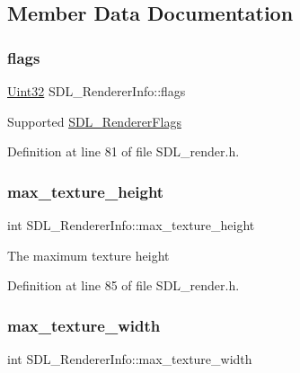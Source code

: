\subsection{Member Data Documentation}
\mbox{\label{struct_s_d_l___renderer_info_a95cf0ffd1704fd0a4dd8ceac6c9f0542}} 
\subsubsection{\texorpdfstring{flags}{flags}}
{\footnotesize\ttfamily \mbox{\hyperlink{_s_d_l__stdinc_8h_add440eff171ea5f55cb00c4a9ab8672d}{Uint32}} S\+D\+L\+\_\+\+Renderer\+Info\+::flags}

Supported \mbox{\hyperlink{_s_d_l__render_8h_a3a6e51bbee5fd3f8ee0c9f7504ae4130}{S\+D\+L\+\_\+\+Renderer\+Flags}} 

Definition at line 81 of file S\+D\+L\+\_\+render.\+h.

\mbox{\label{struct_s_d_l___renderer_info_a87c6a13e8d535c2148f8913c05e13102}} 
\subsubsection{\texorpdfstring{max\_texture\_height}{max\_texture\_height}}
{\footnotesize\ttfamily int S\+D\+L\+\_\+\+Renderer\+Info\+::max\+\_\+texture\+\_\+height}

The maximum texture height 

Definition at line 85 of file S\+D\+L\+\_\+render.\+h.

\mbox{\label{struct_s_d_l___renderer_info_a6e6757e3d5c1f0922adaba39380edfa6}} 
\subsubsection{\texorpdfstring{max\_texture\_width}{max\_texture\_width}}
{\footnotesize\ttfamily int S\+D\+L\+\_\+\+Renderer\+Info\+::max\+\_\+texture\+\_\+width}


